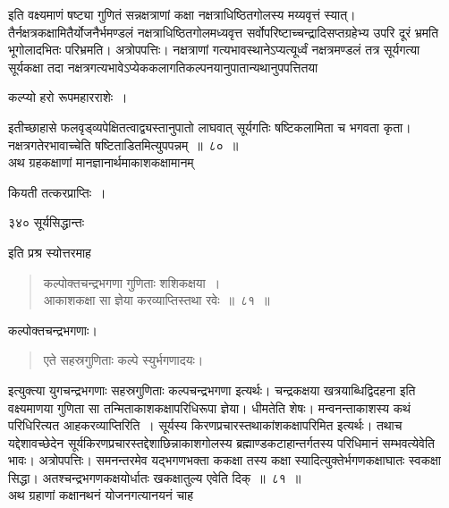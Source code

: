 \documentclass[11pt, openany]{book}
\begin{document}
इति वक्ष्यमाणं षष्ट्या गुणितं सन्नक्षत्राणां कक्षा नक्षत्राधिष्ठितगोलस्य मय्यवृत्तं स्यात्। तैर्नक्षत्रकक्षामितैर्योजनैर्भमण्डलं नक्षत्राधिष्ठितगोलमध्यवृत्त सर्वोपरिष्टाच्चन्द्रादिसप्तग्रहेभ्य उपरि दूरं भ्रमति भूगोलादभितः परिभ्रमति। अत्रोपपत्तिः। नक्षत्राणां गत्यभावस्थानेऽप्यत्यूर्ध्वं नक्षत्रमण्डलं तत्र सूर्यगत्या सूर्यकक्षा तदा नक्षत्रगत्यभावेऽप्येककलागतिकल्पनयानुपातान्यथानुपपत्तितया 

\begin{center}
 {\qt कल्प्यो हरो रूपमहारराशेः~।}
\end{center}

इतीच्छाहासे फलवृड्व्यपेक्षितत्वाद्व्यस्तानुपातो लाघवात् सूर्यगतिः षष्टिकलामिता च भगवता कृता। नक्षत्रगतेरभावाच्चेति षष्टिताडितमित्युपपन्नम्~॥~८०~॥\\
\noindent अथ ग्रहकक्षाणां मानज्ञानार्थमाकाशकक्षामानम् \textendash

\begin{center}
{\qt कियती तत्करप्राप्तिः~।} 
\end{center}




\newpage

\noindent ३४० \hspace{4cm} सूर्यसिद्धान्तः
\vspace{1cm}


\noindent इति प्रश्र स्योत्तरमाह\textendash


\begin{quote}
{\ssi  कल्पोक्तचन्द्रभगणा गुणिताः शशिकक्षया~।\\
आकाशकक्षा सा ज्ञेया करव्याप्तिस्तथा रवेः~॥~८१~॥}
\end{quote}

 कल्पोक्तचन्द्रभगणाः। 

\begin{quote}
{\qt एते सहस्रगुणिताः कल्पे स्युर्भगणादयः। }
\end{quote}

इत्युक्त्या युगचन्द्रभगणाः सहस्रगुणिताः कल्पचन्द्रभगणा इत्यर्थः। चन्द्रकक्षया खत्रयाब्धिद्विदहना इति वक्ष्यमाणया गुणिता सा तन्मिताकाशकक्षापरिधिरूपा ज्ञेया। धीमतेति शेषः। मन्वनन्ताकाशस्य कथं परिधिरित्यत आह\textendash करव्याप्तिरिति~। सूर्यस्य किरणप्रचारस्तथाकांशकक्षापरिमित इत्यर्थः। तथाच यद्देशावच्छेदेन सूर्यकिरणप्रचारस्तद्देशाछिन्नाकाशगोलस्य ब्रह्माण्डकटाहान्तर्गतस्य परिधिमानं सम्भवत्येवेति भावः। अत्रोपपत्तिः। समनन्तरमेव यद्भगणभक्ता ककक्षा तस्य कक्षा स्यादित्युक्तेर्भगणकक्षाघातः स्वकक्षा सिद्धा। अतश्चन्द्रभगणकक्षयोर्धातः खकक्षातुल्य एवेति दिक्~॥~८१~॥ \\
\noindent अथ ग्रहाणां कक्षानथनं योजनगत्यानयनं चाह\textendash
\end{document}
